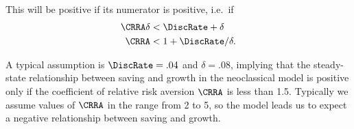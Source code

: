 \documentclass{handout}
\begin{document}
This will be positive if its numerator is positive, i.e.\ if
\begin{equation}\begin{gathered}\begin{aligned}
         \CRRA \delta & <  \DiscRate + \delta
\\  \CRRA & <  1+\DiscRate/\delta  .
\end{aligned}\end{gathered}\end{equation}

A typical assumption is $\DiscRate = .04$ and $\delta = .08$, implying that 
the steady-state relationship between saving and growth in the neoclassical
model is positive only if the coefficient of relative risk aversion $\CRRA$
is less than 1.5.  Typically we assume values of $\CRRA$ in the range from
2 to 5, so the model leads us to expect a negative relationship between saving
and growth.
\end{document}
